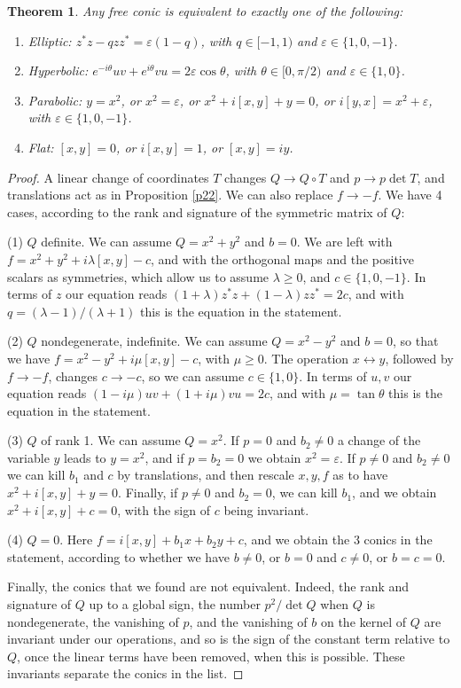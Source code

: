 \documentclass[11pt]{amsart}
\newtheorem{theorem}{Theorem}[section]
\theoremstyle{definition}
\begin{document}
\begin{theorem}\label{t31}
Any free conic is equivalent to exactly one of the following:
\begin{enumerate}
\item Elliptic: $z^*z-qzz^*=\varepsilon(1-q)$, with $q\in[-1,1)$ and $\varepsilon\in\{1,0,-1\}$.

\item Hyperbolic: $e^{-i\theta}uv+e^{i\theta}vu=2\varepsilon\cos\theta$, with $\theta\in[0,\pi/2)$ and $\varepsilon\in\{1,0\}$.

\item Parabolic: $y=x^2$, or $x^2=\varepsilon$, or $x^2+i[x,y]+y=0$, or $i[y,x]=x^2+\varepsilon$, with $\varepsilon\in\{1,0,-1\}$.

\item Flat: $[x,y]=0$, or $i[x,y]=1$, or $[x,y]=iy$.
\end{enumerate}
\end{theorem}

\begin{proof}
A linear change of coordinates $T$ changes $Q\to Q\circ T$ and $p\to p\det T$, and translations act as in Proposition \ref{p22}. We can also replace $f\to-f$. We have 4 cases, according to the rank and signature of the symmetric matrix of $Q$:

(1) $Q$ definite. We can assume $Q=x^2+y^2$ and $b=0$. We are left with $f=x^2+y^2+i\lambda[x,y]-c$, and with the orthogonal maps and the positive scalars as symmetries, which allow us to assume $\lambda\geq0$, and $c\in\{1,0,-1\}$. In terms of $z$ our equation reads $(1+\lambda)z^*z+(1-\lambda)zz^*=2c$, and with $q=(\lambda-1)/(\lambda+1)$ this is the equation in the statement.

(2) $Q$ nondegenerate, indefinite. We can assume $Q=x^2-y^2$ and $b=0$, so that we have $f=x^2-y^2+i\mu[x,y]-c$, with $\mu\geq0$. The operation $x\leftrightarrow y$, followed by $f\to-f$, changes $c\to-c$, so we can assume $c\in\{1,0\}$. In terms of $u,v$ our equation reads $(1-i\mu)uv+(1+i\mu)vu=2c$, and with $\mu=\tan\theta$ this is the equation in the statement.

(3) $Q$ of rank 1. We can assume $Q=x^2$. If $p=0$ and $b_2\neq0$ a change of the variable $y$ leads to $y=x^2$, and if $p=b_2=0$ we obtain $x^2=\varepsilon$. If $p\neq0$ and $b_2\neq0$ we can kill $b_1$ and $c$ by translations, and then rescale $x,y,f$ as to have $x^2+i[x,y]+y=0$. Finally, if $p\neq0$ and $b_2=0$, we can kill $b_1$, and we obtain $x^2+i[x,y]+c=0$, with the sign of $c$ being invariant.

(4) $Q=0$. Here $f=i[x,y]+b_1x+b_2y+c$, and we obtain the 3 conics in the statement, according to whether we have $b\neq0$, or $b=0$ and $c\neq0$, or $b=c=0$.

Finally, the conics that we found are not equivalent. Indeed, the rank and signature of $Q$ up to a global sign, the number $p^2/\det Q$ when $Q$ is nondegenerate, the vanishing of $p$, and the vanishing of $b$ on the kernel of $Q$ are invariant under our operations, and so is the sign of the constant term relative to $Q$, once the linear terms have been removed, when this is possible. These invariants separate the conics in the list.
\end{proof}
\end{document}
